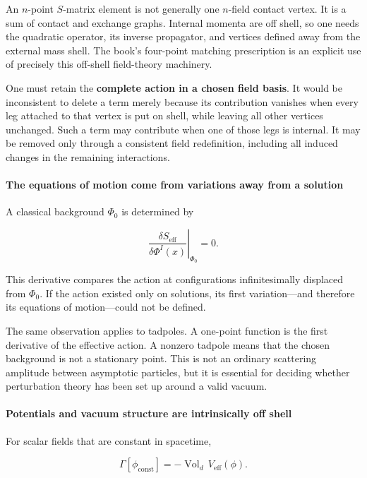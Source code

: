 \documentclass[
  10pt,
  a4paper,
  openany]{book}
\begin{document}
An \(n\)-point \(S\)-matrix element is not generally one \(n\)-field
contact vertex. It is a sum of contact and exchange graphs. Internal
momenta are off shell, so one needs the quadratic operator, its inverse
propagator, and vertices defined away from the external mass shell. The
book's four-point matching prescription is an explicit use of precisely
this off-shell field-theory machinery.

One must retain the \textbf{complete action in a chosen field basis}. It
would be inconsistent to delete a term merely because its contribution
vanishes when every leg attached to that vertex is put on shell, while
leaving all other vertices unchanged. Such a term may contribute when
one of those legs is internal. It may be removed only through a
consistent field redefinition, including all induced changes in the
remaining interactions.

\paragraph{The equations of motion come from variations away from a
solution}\label{the-equations-of-motion-come-from-variations-away-from-a-solution}

A classical background \(\Phi_0\) is determined by

\[
\left.
\frac{\delta S_{\mathrm{eff}}}{\delta\Phi^I(x)}
\right|_{\Phi_0}=0.
\]

This derivative compares the action at configurations infinitesimally
displaced from \(\Phi_0\). If the action existed only on solutions, its
first variation---and therefore its equations of motion---could not be
defined.

The same observation applies to tadpoles. A one-point function is the
first derivative of the effective action. A nonzero tadpole means that
the chosen background is not a stationary point. This is not an ordinary
scattering amplitude between asymptotic particles, but it is essential
for deciding whether perturbation theory has been set up around a valid
vacuum.

\paragraph{Potentials and vacuum structure are intrinsically off
shell}\label{potentials-and-vacuum-structure-are-intrinsically-off-shell}

For scalar fields that are constant in spacetime,

\[
\Gamma[\phi_{\mathrm{const}}]
=-\operatorname{Vol}_d\,V_{\mathrm{eff}}(\phi).
\]
\end{document}
